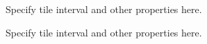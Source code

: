 \documentclass[12pt, a4paper]{article}
\begin{document}
Specify tile interval and other properties here.



Specify tile interval and other properties here.


\end{document}
